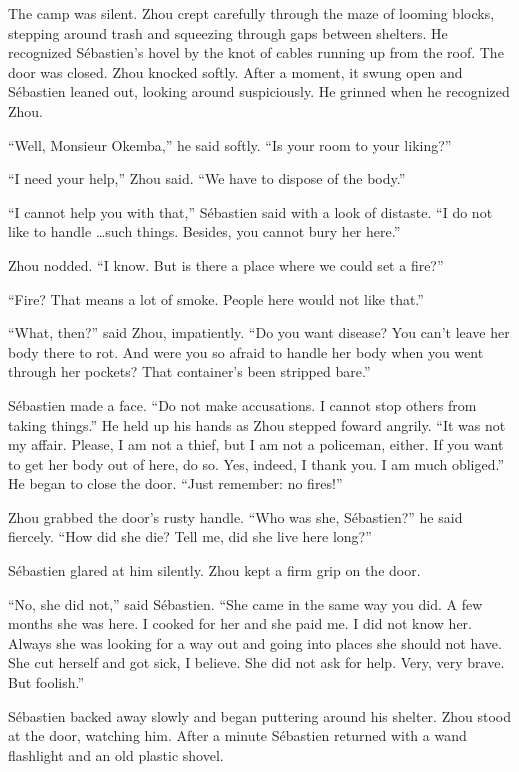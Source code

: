 \documentclass[10pt,a4paper]{article}
\begin{document}
The camp was silent. Zhou crept carefully through the maze of
looming blocks, stepping around trash and squeezing through gaps
between shelters. He recognized S\'{e}bastien's hovel by the knot of
cables running up from the roof. The door was closed. Zhou knocked
softly. After a moment, it swung open and S\'{e}bastien leaned out,
looking around suspiciously. He grinned when he recognized Zhou.

``Well, Monsieur Okemba,'' he said softly. ``Is your room to your
liking?''

``I need your help,'' Zhou said. ``We have to dispose of the body.''

``I cannot help you with that,'' S\'{e}bastien said with a look of
distaste. ``I do not like to handle \ldots such things.  Besides,
you cannot bury her here.''

Zhou nodded. ``I know. But is there a place where we could set a fire?''

``Fire? That means a lot of smoke. People here would not like that.''

``What, then?'' said Zhou, impatiently. ``Do you want disease? You
can't leave her body there to rot. And were you so afraid to handle
her body when you went through her pockets? That container's been
stripped bare.''

S\'{e}bastien made a face. ``Do not make accusations. I cannot stop
others from taking things.'' He held up his hands as Zhou
stepped foward angrily. ``It was not my affair. Please, I am not a
thief, but I am not a policeman, either. If you want to get her body
out of here, do so. Yes, indeed, I thank you. I am much obliged.''
He began to close the door. ``Just remember: no fires!''

Zhou grabbed the door's rusty handle. ``Who was she, S\'{e}bastien?'' he
said fiercely. ``How did she die? Tell me, did she live here long?''

S\'{e}bastien glared at him silently. Zhou kept a firm grip on the door.

``No, she did not,'' said S\'{e}bastien. ``She came in the same way you
did. A few months she was here. I cooked for her and she paid me. I
did not know her. Always she was looking for a way out and going
into places she should not have. She cut herself and got sick,
I believe. She did not ask for help. Very, very brave. But foolish.''

S\'{e}bastien backed away slowly and began puttering around his
shelter. Zhou stood at the door, watching him. After a minute
S\'{e}bastien returned with a wand flashlight and an old plastic shovel.
\end{document}
